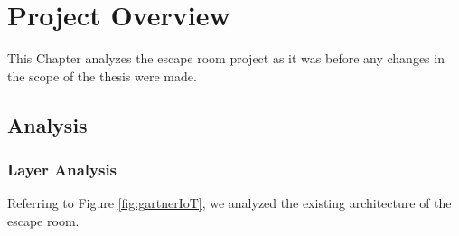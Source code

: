 \chapter{Project Overview} %
\label{Chapter3} %
This Chapter analyzes the escape room project as it was before any 
changes in the scope of the thesis were made.

\section{Analysis}

\subsection{Layer Analysis}
Referring to Figure \ref{fig:gartnerIoT}, we analyzed the existing architecture of the escape room.

